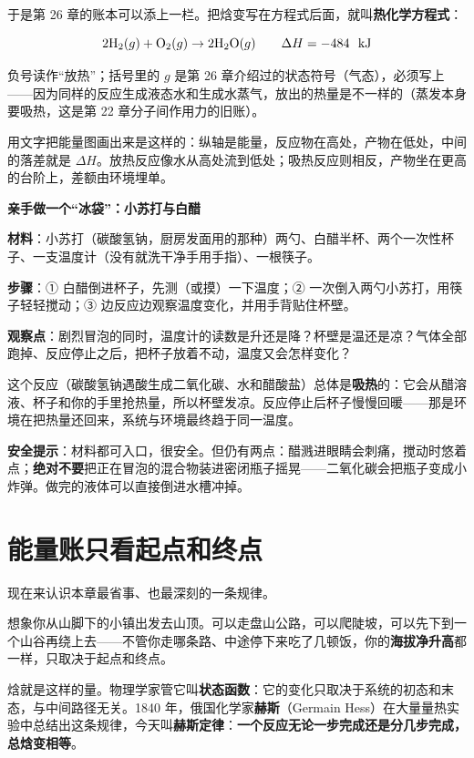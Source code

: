 于是第 26 章的账本可以添上一栏。把焓变写在方程式后面，就叫\textbf{热化学方程式}：

\[ \chem{2H_2}(g) + \chem{O_2}(g) \rightarrow \chem{2H_2O}(g) \qquad \Delta H = -484\ \ud{}{kJ} \]

负号读作“放热”；括号里的 $g$ 是第 26 章介绍过的状态符号（气态），必须写上——因为同样的反应生成液态水和生成水蒸气，放出的热量是不一样的（蒸发本身要吸热，这是第 22 章分子间作用力的旧账）。

用文字把能量图画出来是这样的：纵轴是能量，反应物在高处，产物在低处，中间的落差就是 $\Delta H$。放热反应像水从高处流到低处；吸热反应则相反，产物坐在更高的台阶上，差额由环境埋单。

\begin{shiyan}
\textbf{亲手做一个“冰袋”：小苏打与白醋}

\textbf{材料}：小苏打（碳酸氢钠，厨房发面用的那种）两勺、白醋半杯、两个一次性杯子、一支温度计（没有就洗干净手用手指）、一根筷子。

\textbf{步骤}：① 白醋倒进杯子，先测（或摸）一下温度；② 一次倒入两勺小苏打，用筷子轻轻搅动；③ 边反应边观察温度变化，并用手背贴住杯壁。

\textbf{观察点}：剧烈冒泡的同时，温度计的读数是升还是降？杯壁是温还是凉？气体全部跑掉、反应停止之后，把杯子放着不动，温度又会怎样变化？

这个反应（碳酸氢钠遇酸生成二氧化碳、水和醋酸盐）总体是\textbf{吸热}的：它会从醋溶液、杯子和你的手里抢热量，所以杯壁发凉。反应停止后杯子慢慢回暖——那是环境在把热量还回来，系统与环境最终趋于同一温度。

\textbf{安全提示}：材料都可入口，很安全。但仍有两点：醋溅进眼睛会刺痛，搅动时悠着点；\textbf{绝对不要}把正在冒泡的混合物装进密闭瓶子摇晃——二氧化碳会把瓶子变成小炸弹。做完的液体可以直接倒进水槽冲掉。
\end{shiyan}

\section{能量账只看起点和终点}

现在来认识本章最省事、也最深刻的一条规律。

想象你从山脚下的小镇出发去山顶。可以走盘山公路，可以爬陡坡，可以先下到一个山谷再绕上去——不管你走哪条路、中途停下来吃了几顿饭，你的\textbf{海拔净升高}都一样，只取决于起点和终点。

焓就是这样的量。物理学家管它叫\textbf{状态函数}：它的变化只取决于系统的初态和末态，与中间路径无关。1840 年，俄国化学家\textbf{赫斯}（Germain Hess）在大量量热实验中总结出这条规律，今天叫\textbf{赫斯定律}：\textbf{一个反应无论一步完成还是分几步完成，总焓变相等}。

